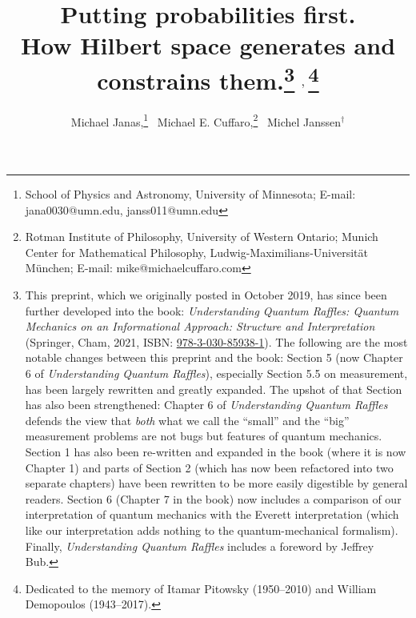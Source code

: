 \documentclass[12pt]{article}
\numberwithin{equation}{section}
\begin{document}
\title{Putting probabilities first. \\ How Hilbert space generates and constrains them.\footnote{This preprint, which we originally posted in October 2019, has since been further developed into the book: \emph{Understanding Quantum Raffles: Quantum Mechanics on an Informational Approach: Structure and Interpretation} (Springer, Cham, 2021, ISBN: \href{https://www.springer.com/gp/book/9783030859381}{978-3-030-85938-1}). The following are the most notable changes between this preprint and the book: Section 5 (now Chapter 6 of \emph{Understanding Quantum Raffles}), especially Section 5.5 on measurement, has been largely rewritten and greatly expanded. The upshot of that Section has also been strengthened: Chapter 6 of \emph{Understanding Quantum Raffles} defends the view that \emph{both} what we call the ``small'' and the ``big'' measurement problems are not bugs but features of quantum mechanics. Section 1 has also been re-written and expanded in the book (where it is now Chapter 1) and parts of Section 2 (which has now been refactored into two separate chapters) have been rewritten to be more easily digestible by general readers. Section 6 (Chapter 7 in the book) now includes a comparison of our interpretation of quantum mechanics with the Everett interpretation (which like our interpretation adds nothing to the quantum-mechanical formalism). Finally, \emph{Understanding Quantum Raffles} includes a foreword by Jeffrey Bub.}$~\;^{\raisebox{-.1em}{\normalsize ,}}\,$\footnote{Dedicated to the memory of Itamar Pitowsky (1950--2010) and William Demopoulos (1943--2017).}}

\author{Michael Janas,\footnote{School of Physics and Astronomy, University of Minnesota; E-mail: jana0030@umn.edu, janss011@umn.edu} \, Michael E. Cuffaro,\footnote{Rotman Institute of Philosophy, University of Western Ontario; Munich Center for Mathematical Philosophy, Ludwig-Maximilians-Universit\"at M\"unchen; E-mail: mike@michaelcuffaro.com} \, Michel Janssen$^\dagger$}
\date{}

\maketitle
\end{document}
